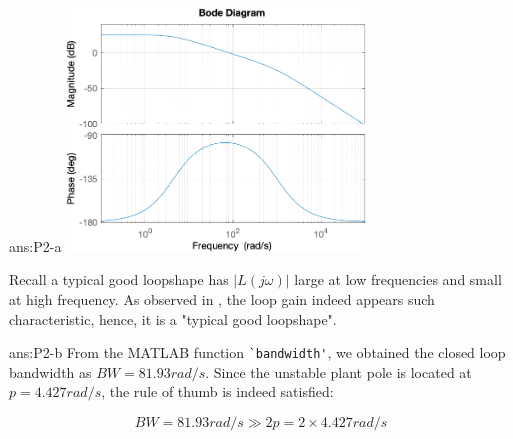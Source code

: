 \documentclass{tron}
\begin{document}
\begin{answer}[(a) Loop Gain $L_1(s) = P_1(s) C_1(s)$ Bode Plot]{ans:P2-a}
		{	
			\centering\includegraphics[width=300px]{../matlab/output/q2/bode_plot_L1}
		}
		
		Recall a typical good loopshape has $|L(j\omega)|$ large at low frequencies and small at high frequency. As observed in , the loop gain indeed appears such characteristic, hence, it is a "typical good loopshape".
\end{answer}

\begin{answer}{ans:P2-b}
	From the MATLAB function \verb|`bandwidth'|, we obtained the closed loop bandwidth as $BW = 81.93 \unit{rad/s}$. Since the unstable plant pole is located at $p=4.427 \unit{rad/s}$, the rule of thumb is indeed satisfied:
	
	\begin{equation}
		BW = 81.93 \unit{rad/s} \gg 2p = 2 \times 4.427 \unit{rad/s}
	\end{equation}
\end{answer}
\end{document}
